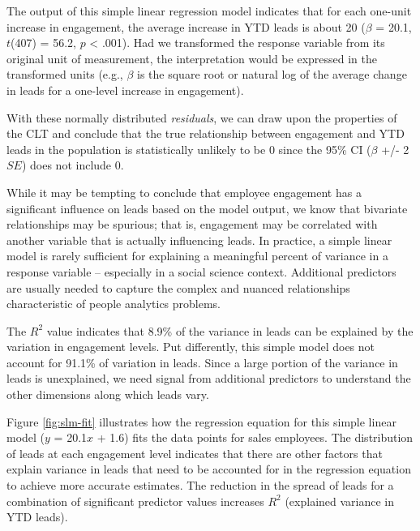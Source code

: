 \documentclass[
]{book}
\begin{document}
The output of this simple linear regression model indicates that for each one-unit increase in engagement, the average increase in YTD leads is about 20 (\(\beta\) = 20.1, \(t\)(407) = 56.2, \(p\) \textless{} .001). Had we transformed the response variable from its original unit of measurement, the interpretation would be expressed in the transformed units (e.g., \(\beta\) is the square root or natural log of the average change in leads for a one-level increase in engagement).

With these normally distributed \emph{residuals}, we can draw upon the properties of the CLT and conclude that the true relationship between engagement and YTD leads in the population is statistically unlikely to be 0 since the 95\% CI (\(\beta\) +/- 2\(SE\)) does not include 0.

While it may be tempting to conclude that employee engagement has a significant influence on leads based on the model output, we know that bivariate relationships may be spurious; that is, engagement may be correlated with another variable that is actually influencing leads. In practice, a simple linear model is rarely sufficient for explaining a meaningful percent of variance in a response variable -- especially in a social science context. Additional predictors are usually needed to capture the complex and nuanced relationships characteristic of people analytics problems.

The \(R^2\) value indicates that 8.9\% of the variance in leads can be explained by the variation in engagement levels. Put differently, this simple model does not account for 91.1\% of variation in leads. Since a large portion of the variance in leads is unexplained, we need signal from additional predictors to understand the other dimensions along which leads vary.

Figure \ref{fig:slm-fit} illustrates how the regression equation for this simple linear model (\(y\) = 20.1\(x\) + 1.6) fits the data points for sales employees. The distribution of leads at each engagement level indicates that there are other factors that explain variance in leads that need to be accounted for in the regression equation to achieve more accurate estimates. The reduction in the spread of leads for a combination of significant predictor values increases \(R^2\) (explained variance in YTD leads).
\end{document}
